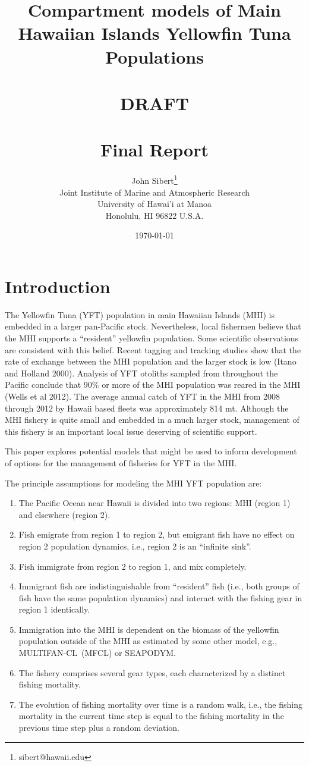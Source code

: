 \documentclass[12pt,letterpaper]{article}
\title{Compartment models of Main Hawaiian Islands Yellowfin Tuna
Populations\\
~\\
\color{red}DRAFT\normalcolor\\
~\\
Final Report}
\author{
John Sibert\thanks{sibert@hawaii.edu}\\
Joint Institute of Marine and Atmospheric Research\\
University of Hawai'i at Manoa\\
Honolulu, HI  96822 U.S.A.\\[0.125in]
\date{\today}
}
\newcommand\doublespacing{\baselineskip=1.6\normalbaselineskip}
\newcommand\SD{SEAPODYM}
\newcommand\MFCL{MULTIFAN-CL}
\begin{document}
\maketitle

\doublespacing

\section*{Introduction}
The Yellowfin Tuna (YFT) population in main Hawaiian Islands (MHI) is
embedded in a larger pan-Pacific stock. Nevertheless, local fishermen
believe that the MHI supports a ``resident'' yellowfin population.
Some scientific observations are consistent with this belief. 
Recent tagging and tracking
studies show that the rate of exchange between the MHI population
and the larger stock is low (Itano and Holland 2000). Analysis
of YFT otoliths sampled from
throughout the Pacific conclude that 90\% or more of the MHI
population was reared in the MHI (Wells et al 2012).
The average annual catch of YFT in the MHI from 2008 through 2012 by Hawaii
based fleets was approximately 814 mt. 
Although the MHI fishery is quite small and embedded in a much larger
stock, management of this
fishery is an important local issue deserving of scientific support.

This paper explores potential models that might be used to
inform development of options for the management of fisheries for YFT
in the MHI.

The principle assumptions for modeling the MHI YFT population are:
\begin{enumerate}
\item The Pacific Ocean near Hawaii is divided into two regions:
MHI (region 1) and elsewhere (region 2).%
\item Fish emigrate from region 1 to region 2, but emigrant fish have
no effect on region 2 population dynamics, i.e., region 2 is an ``infinite
sink''.
\item Fish immigrate from region 2 to region 1, and mix completely.
\item Immigrant fish are indistinguishable from ``resident'' fish
(i.e., both groups of fish have the same population dynamics) and
interact with the fishing gear in region 1 identically.
\item Immigration into the MHI is dependent on the
biomass of the yellowfin population outside of the MHI as estimated by
some other model, e.g., \MFCL\ (MFCL) or \SD.
\item The fishery comprises several gear types, each characterized by 
a distinct fishing mortality.
\item The evolution of fishing mortality over time is a random walk,
i.e., the fishing mortality in the current time step is equal
to the fishing mortality in the previous time step plus a random
deviation.
\end{enumerate}
\end{document}
